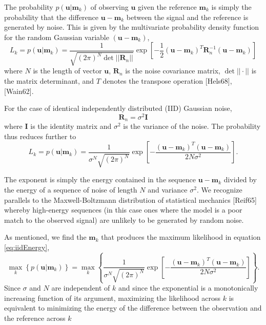 The probability $p(\mathbf{u}|\mathbf{m}_k)$ of observing $\mathbf{u}$ given the reference $\mathbf{m}_k$ is simply the probability that the difference $\mathbf{u}-\mathbf{m}_k$ between the signal and the reference is generated by noise. This is given by the multivariate probability density function for the random Gaussian variable $(\mathbf{u}-\mathbf{m}_k)$, 
\begin{equation}\label{eq:Main}
L_k = p(\mathbf{u}|\mathbf{m}_k) = \frac{1}{  \sqrt{ (2\pi)^N \det || \mathbf{R}_n||} } \exp\left[ -\frac{1}{2}  (\mathbf{u}-\mathbf{m}_k)^T \mathbf{R}_n^{-1} (\mathbf{u}-\mathbf{m}_k) \right]
\end{equation}
where $N$ is the length of vector $\mathbf{u}$, $\mathbf{R}_n$ is the noise covariance matrix, $\det||{\cdot}||$ is the matrix determinant, and $T$ denotes the transpose operation [Hels68], [Wain62].
 
For the case of identical independently distributed (IID) Gaussian noise, 
\begin{equation}
\mathbf{R}_n=\sigma^2 \mathbf{I}
\end{equation}
where $\mathbf{I}$ is the identity matrix and $\sigma^2$ is the variance of the noise. The probability thus reduces further to
\begin{equation}\label{eq:iidEnergy}
L_k = p(\mathbf{u}|\mathbf{m}_k) = \frac{1}{  \sigma^N \sqrt{ (2\pi)^N}   } \exp\left[ -\frac{(\mathbf{u}-\mathbf{m}_k)^T(\mathbf{u}-\mathbf{m}_k)} {2 N \sigma^2 } \right].
\end{equation}

The exponent is simply the energy contained in the sequence $\mathbf{u}-\mathbf{m}_k$ divided by the
energy of a sequence of noise of length $N$ and variance $\sigma^2$. We recognize parallels to the Maxwell-Boltzmann distribution of statistical mechanics [Reif65] whereby high-energy sequences (in this case ones where the model is a poor match to the observed signal) are unlikely to be generated by random noise.  

As mentioned, we find the $\mathbf{m}_k$ that produces the maximum likelihood in equation \ref{eq:iidEnergy},
\begin{equation}
\max_k   \left\{ p(\mathbf{u}|\mathbf{m}_k) \right\} =  \max_k  \left\{ \frac{1}{   \sigma^N\sqrt{ (2\pi)^N}  } \exp\left[ -\frac{(\mathbf{u}-\mathbf{m}_k)^T(\mathbf{u}-\mathbf{m}_k)} {2 N \sigma^2 } \right] \right\}. 
\end{equation}
Since $\sigma$ and $N$ are independent of $k$ and since the exponential is a monotonically increasing function of its argument, maximizing the likelihood across $k$ is equivalent to minimizing the energy of the difference between the observation and the reference across $k$ 

